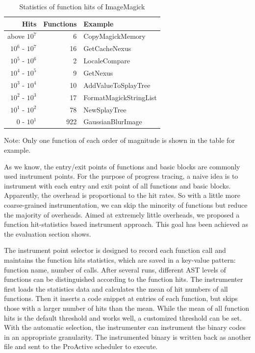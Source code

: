\begin{table}[h]
\caption{Statistics of function hits of ImageMagick}
\label{table:inst-stats}
\begin{center}
\begin{tabular}{r|r|l}
\hline
Hits & Functions & Example \\
\hline
above $10^7$ & 6 & CopyMagickMemory \\
$10^6$ - $10^7$ & 16 & GetCacheNexus \\
$10^5$ - $10^6$ & 2 & LocaleCompare \\
$10^4$ - $10^5$ & 9 & GetNexus \\
$10^3$ - $10^4$ & 10 & AddValueToSplayTree \\
$10^2$ - $10^3$ & 17 & FormatMagickStringList \\
$10^1$ - $10^2$ & 78 & NewSplayTree \\
$0$    - $10^1$ & 922 & GaussianBlurImage \\
\hline
\end{tabular}
\end{center}
Note: Only one function of each order of magnitude is shown in the table for example.
\end{table}

As we know, the entry/exit points of functions and basic blocks are commonly used
instrument points. For the purpose of progress tracing, a naive idea is to instrument with
each entry and exit point of all functions and basic blocks. Apparently, the overhead is
proportional to the hit rates. So with a little more coarse-grained instrumentation, we
can skip the minority of functions but reduce the majority of overheads. Aimed at
extremely little overheads, we proposed a function hit-statistics based instrument
approach. This goal has been achieved as the evaluation section shows.

The instrument point selector is designed to record each function call and maintains the
function hits statistics, which are saved in a key-value pattern: function name, number of
calls. After several runs, different AST levels of functions can be distinguished
according to the function hits. The instrumenter first loads the statistics data and
calculates the mean of hit numbers of all functions. Then it inserts a code snippet at
entries of each function, but skips those with a larger number of hits than the mean.
While the mean of all function hits is the default threshold and works well, a customized
threshold can be set. With the automatic selection, the instrumenter can instrument the
binary codes in an appropriate granularity. The instrumented binary is written back as
another file and sent to the ProActive scheduler to execute.

